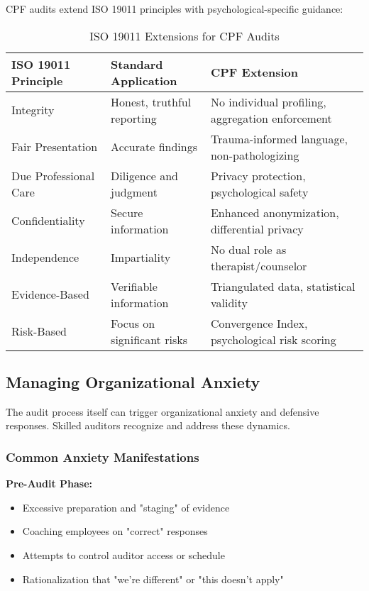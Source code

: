 \documentclass[11pt,a4paper]{article}
\begin{document}
CPF audits extend ISO 19011 principles with psychological-specific guidance:

\begin{table}[h]
\centering
\caption{ISO 19011 Extensions for CPF Audits}
\small
\begin{tabular}{p{3.5cm}p{5cm}p{5cm}}
\toprule
\textbf{ISO 19011 Principle} & \textbf{Standard Application} & \textbf{CPF Extension} \\
\midrule
Integrity & Honest, truthful reporting & No individual profiling, aggregation enforcement \\
Fair Presentation & Accurate findings & Trauma-informed language, non-pathologizing \\
Due Professional Care & Diligence and judgment & Privacy protection, psychological safety \\
Confidentiality & Secure information & Enhanced anonymization, differential privacy \\
Independence & Impartiality & No dual role as therapist/counselor \\
Evidence-Based & Verifiable information & Triangulated data, statistical validity \\
Risk-Based & Focus on significant risks & Convergence Index, psychological risk scoring \\
\bottomrule
\end{tabular}
\end{table}

\subsection{Managing Organizational Anxiety}

The audit process itself can trigger organizational anxiety and defensive responses. Skilled auditors recognize and address these dynamics.

\subsubsection{Common Anxiety Manifestations}

\textbf{Pre-Audit Phase:}
\begin{itemize}
\item Excessive preparation and "staging" of evidence
\item Coaching employees on "correct" responses
\item Attempts to control auditor access or schedule
\item Rationalization that "we're different" or "this doesn't apply"
\end{itemize}
\end{document}
